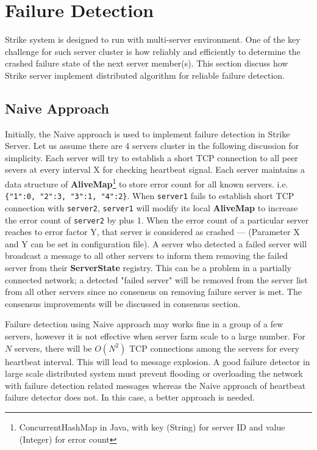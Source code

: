 \documentclass[dareport.tex]{subfiles}
\begin{document}
\section{Failure Detection}
Strike system is designed to run with multi-server environment. One of the key challenge for such server cluster is how reliably and efficiently to determine the crashed failure state of the next server member(s). This section discuss how Strike server implement distributed algorithm for reliable failure detection.

\subsection{Naive Approach}

Initially, the Naive approach is used to implement failure detection in Strike Server. Let us assume there are 4 servers cluster in the following discussion for simplicity. Each server will try to establish a short TCP connection to all peer severs at every interval X for checking heartbeat signal. Each server maintains a data structure of \textbf{AliveMap}\footnote{ConcurrentHashMap in Java, with key (String) for server ID and value (Integer) for error count} to store error count for all known servers. i.e. \verb|{"1":0, "2":3, "3":1, "4":2}|. When \verb|server1| fails to establish short TCP connection with \verb|server2|, \verb|server1| will modify its local \textbf{AliveMap} to increase the error count of \verb|server2| by plus 1. When the error count of a particular server reaches to error factor Y, that server is considered as crashed --- (Parameter X and Y can be set in configuration file). A server who detected a failed server will broadcast a message to all other servers to inform them removing the failed server from their \textbf{ServerState} registry. This can be a problem in a partially connected network; a detected "failed server" will be removed from the server list from all other servers since no consensus on removing failure server is met. The consensus improvements will be discussed in consensus section.

Failure detection using Naive approach may works fine in a group of a few servers, however it is not effective when server farm scale to a large number. For $N$ servers, there will be $O(N^{2})$ TCP connections among the servers for every heartbeat interval. This will lead to message explosion\cite{failuredetector}. A good failure detector in large scale distributed system must prevent flooding or overloading the network with failure detection related messages whereas the Naive approach of heartbeat failure detector does not. In this case, a better approach is needed.
\end{document}
